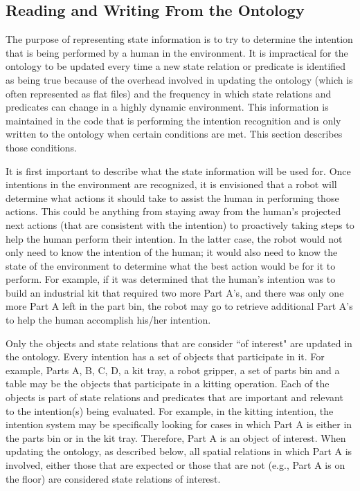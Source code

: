 \documentclass[preprint,12pt]{elsarticle}
\begin{document}
\subsection{Reading and Writing From the Ontology}
The purpose of representing state information is to try to determine the intention that is being performed by a human in the environment. It is impractical for the ontology to be updated every time a new state relation or predicate is identified as being true because of the overhead involved in updating the ontology (which is often represented as flat files) and the frequency in which state relations and predicates can change in a highly dynamic environment.  This information is maintained in the code that is performing the intention recognition and is only written to the ontology when certain conditions are met. This section describes those conditions.


It is first important to describe what the state information will be used for. Once intentions in the environment are recognized, it is envisioned that a robot will determine what actions it should take to assist the human in performing those actions. This could be anything from staying away from the human's projected next actions (that are consistent with the intention) to proactively taking steps to help the human perform their intention. In the latter case, the robot would not only need to know the intention of the human; it would also need to know the state of the environment to determine what the best action would be for it to perform. For example, if it was determined that the human's intention was to build an industrial kit that required two more Part A's, and there was only one more Part A left in the part bin, the robot may go to retrieve additional Part A's to help the human accomplish his/her intention.

Only the objects and state relations that are consider ``of interest" are updated in the ontology. Every intention has a set of objects that participate in it. For example, Parts A, B, C, D, a kit tray, a robot gripper, a set of parts bin and a table may be the objects that participate in a kitting operation. Each of the objects is part of state relations and predicates that are important and relevant to the intention(s) being evaluated. For example, in the kitting intention, the intention system may be specifically looking for cases in which Part A is either in the parts bin or in the kit tray. Therefore, Part A is an object of interest. When updating the ontology, as described below, all spatial relations in which Part A is involved, either those that are expected or those that are not (e.g., Part A is on the floor) are considered state relations of interest.
\end{document}
